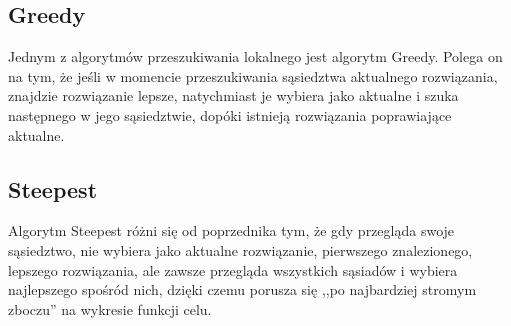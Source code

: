 \subsection{Greedy}

Jednym z algorytmów przeszukiwania lokalnego jest algorytm Greedy. Polega on na tym, że jeśli w momencie przeszukiwania sąsiedztwa aktualnego rozwiązania, znajdzie rozwiązanie lepsze, natychmiast je wybiera jako aktualne i szuka następnego w jego sąsiedztwie, dopóki istnieją rozwiązania poprawiające aktualne.

\subsection{Steepest}

Algorytm Steepest różni się od poprzednika tym, że gdy przegląda swoje sąsiedztwo, nie wybiera jako aktualne rozwiązanie, pierwszego znalezionego, lepszego rozwiązania, ale zawsze przegląda wszystkich sąsiadów i wybiera najlepszego spośród nich, dzięki czemu porusza się ,,po najbardziej stromym zboczu'' na wykresie funkcji celu.